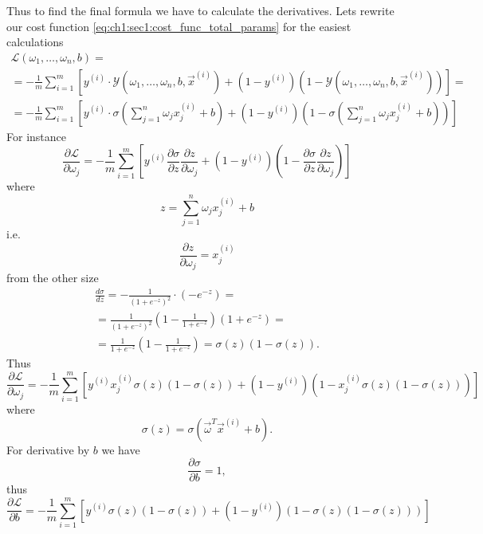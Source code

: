 Thus to find the final formula we have to calculate the derivatives. Lets
rewrite our cost function \ref{eq:ch1:sec1:cost_func_total_params} for the
easiest calculations
\begin{eqnarray}
  \mathcal{L}\left(\omega_1, \dots, \omega_n, b\right) =
  \nonumber \\
  = - \frac{1}{m} \sum_{i =
    1}^{m} \left[ y^{(i)} \cdot \mathcal{Y}\left(\omega_1, \dots, \omega_n, b,
    \vec{x}^{(i)}\right) + 
(1-y^{(i)}) \left(1 - \mathcal{Y}\left(\omega_1, \dots, \omega_n, b,
    \vec{x}^{(i)}\right)\right)\right] =
  \nonumber \\
  =
  - \frac{1}{m} \sum_{i =
    1}^{m} \left[ y^{(i)} \cdot \sigma\left(
    \sum_{j=1}^n \omega_j x_j^{(i)} + b\right) + 
(1-y^{(i)}) \left(1 - \sigma\left(
    \sum_{j=1}^n \omega_j x_j^{(i)} + b\right)\right)\right]
  \nonumber
\end{eqnarray}
For instance
\begin{equation}
 \frac{\partial
   \mathcal{L}}{\partial \omega_j} =
 - \frac{1}{m} \sum_{i =
    1}^{m} \left[ y^{(i)} \frac{\partial \sigma}{\partial z}\frac{\partial
     z}{\partial \omega_j} + 
(1-y^{(i)}) \left(1 - \frac{\partial \sigma}{\partial z}\frac{\partial
     z}{\partial \omega_j}\right)\right]
 \nonumber
\end{equation}
where
\[
z = \sum_{j=1}^n \omega_j x_j^{(i)} +b 
\]
i.e.
\begin{equation}
  \frac{\partial z}{\partial \omega_j} = x_j^{(i)}
  \nonumber
\end{equation}
from the other size
\begin{eqnarray}
  \frac{d \sigma}{d z} = - \frac{1}{\left(1 + e^{-z}\right)^2} \cdot \left( -
  e^{-z}\right) =
  \nonumber \\
  = \frac{1}{\left(1 + e^{-z}\right)^2} \left(1 - \frac{1}{1 +
    e^{-z}}\right)\left(1 + e^{-z}\right) =
  \nonumber \\
  = \frac{1}{1 + e^{-z}} \left(1 - \frac{1}{1 +
    e^{-z}}\right) = \sigma(z) \left(1 - \sigma(z)\right).
  \nonumber 
\end{eqnarray}
Thus
\begin{equation}
 \frac{\partial
   \mathcal{L}}{\partial \omega_j} =
 - \frac{1}{m} \sum_{i =
    1}^{m} \left[ y^{(i)} x_j^{(i)} \sigma(z)(1-\sigma(z)) + 
(1-y^{(i)}) \left(1 -  x_j^{(i)} \sigma(z)(1-\sigma(z))\right)\right]
 \nonumber
\end{equation}
where
\[
\sigma(z) = \sigma\left(\vec{\omega}^T\vec{x}^{(i)} + b\right).
\]
For derivative by $b$ we have
\[
\frac{\partial \sigma}{\partial b} = 1,
\]
thus
\begin{equation}
 \frac{\partial
   \mathcal{L}}{\partial b} =
 - \frac{1}{m} \sum_{i =
    1}^{m} \left[ y^{(i)} \sigma(z)(1-\sigma(z)) + 
(1-y^{(i)}) \left(1 -   \sigma(z)(1-\sigma(z))\right)\right]
 \nonumber
\end{equation}

